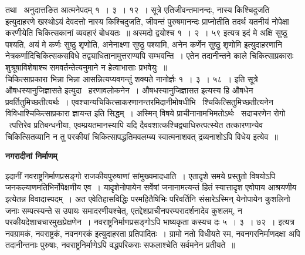 \documentclass[11pt, openany]{book}
\begin{document}
तथा \textendash\ अनुदात्तङित आत्मनेपदम् १~। ३~। १२~। सूत्रे {\qt एतिजीवन्तमानन्दः, नास्य किश्चिदुजति} इत्युदाहरणे खस्थोऽयं देवदत्तो नास्य किश्चिदुजति, जीवन्तं पुरुषमानन्दः प्राप्नोतीति तदर्थ यतनीयं नोपेक्षा करणीयेति चिकित्सकानां व्यवहारं बोधयतः~॥ अस्मदो द्वयोश्च १~। २~। ५९ इत्यत्र {\qt इदं मे अक्षि सुष्ठु पश्यति, अयं मे कर्णः सुष्ठु शृणोति, अनेनाक्ष्णा सुष्ठु पश्यामि, अनेन कर्णेन सुष्ठु शृणोमि} इत्युदाहरणानि नेत्रकर्णादिचिकित्सकसविधे तद्व्याधितानामुत्तराण्यपि सम्भवन्ति~। एतेन तदानीन्तने काले चिकित्साप्रकाराः शुश्रूषाविशेषाश्च समवर्तन्तेत्यनुमाने न हेत्वाभासाः प्रभवेयुः~॥\\

चिकित्साप्रकारा भिन्ना भिन्ना आसन्नित्यप्यवगन्तुं शक्यते नानोर्ज्ञः १~। ३~। ५८~। इति सूत्रे औषधस्यानुजिज्ञासते इत्युदा \textendash\ हरणावलोकनेन~। औषधस्यानुजिज्ञासत इत्यस्य हि औषधेन प्रवर्तितुमिच्छतीत्यर्थः~। एवश्चान्यचिकित्साकरणानन्तरमिदानीमोषधीभि \textendash\ श्चिकित्सितुमिच्छतीत्यनेन विविधाश्चिकित्साप्रकारा ज्ञायन्त इति सिद्धम्~। अस्मिन् विषये प्राचीनानामभिमतोऽर्थः \textendash\ सदाचरणेन रोगो \textendash\ त्पत्तिरेव प्रतिबन्धनीया, एवम्प्रयतमानस्यापि यदि दैववशात्कश्चिद्व्याधिरुत्पत्स्येत तत्कारणान्येव चिकित्सितव्यानि न तु परकीयां चिकित्सापद्धतिमवलम्ब्य स्वात्मनाशवत् द्रव्यनाशोऽपि विधेय इत्येव~॥

\newpage

\begin{center}
\textbf{\Large नगरादीनां निर्माणम् \textendash\ }
\end{center}

इदानीं नवराष्ट्रनिर्माणप्रसङ्गो राजकीयपुरुषाणां सांमुख्यमादधाति~। एतादृशे समये प्रस्तुतो विषयोऽपि जनकल्याणमतिभिर्नोपेक्षणीय एव~। यादृशेनोपायेन सर्वेषां जनानामत्यन्तं हितं स्यात्तादृश एवोपाय आश्रयणीय इत्येतन्न विवादास्पदम्~। अत एवेतिहासविद्धिः परमहितैषिभिः परिवर्तिनि संसारेऽस्मिन् येनोपायेन कुशलिनो जनाः सम्पत्स्यन्ते स उपायः समादरणीयश्चेत्, एतद्देशप्राचीनपरम्परादर्शनादेव कुशलम्, न परकीयदेशाचचारमुखप्रेक्षणेन~। नवराष्ट्रनिर्माणप्रसङ्गोऽपि भाष्यकृता कस्यच दः ५~। ३~। ७२~। इत्यत्र नवग्रामकं, नवराष्ट्रकं, नवनगरकं इत्युदाहरता प्रतिपादितः~। ग्रामो नतो विधीयते स्म, नवनगरनिर्माणदक्षा अपि तदानीन्तनाः पुरुषाः, नवराष्ट्रनिर्माणेऽपि वद्धपरिकराः सफलाश्चेति सर्वमनेन प्रतीयते~॥\\
\end{document}

